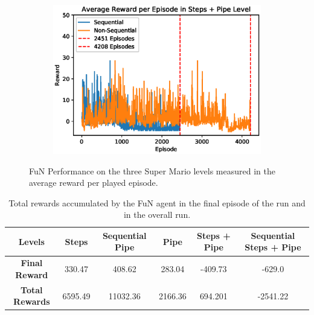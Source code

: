 \documentclass[notitlepage,a4paper,11pt]{article}
\begin{document}
\begin{figure}[htb!]
\begin{subfigure}[t]{0.32\textwidth}
         \includegraphics[width=\textwidth]{figs/fun_results_3.eps}
         \caption{}
         \label{fig:fun_results_3}
     \end{subfigure}
        \caption{FuN Performance on the three Super Mario levels measured in the average reward per played episode.}
        \label{fig:fun_results}
        
\end{figure}

\begin{table}[htb!]
\centering
\begin{tabular}{ |c|c|c|c|c|c| } 
	\hline
	\textbf{Levels} & Steps & Sequential Pipe  & Pipe & Steps + Pipe & Sequential Steps + Pipe \\
	\hline
	\textbf{Final Reward} & 330.47 & 408.62 & 283.04 & -409.73 & -629.0 \\
	\hline
	\textbf{Total Rewards} & 6595.49 & 11032.36 & 2166.36 & 694.201 & -2541.22 \\
	\hline
\end{tabular}
\caption{Total rewards accumulated by the FuN agent in the final episode of the run and in the overall run.}


\end{table}
\end{document}

